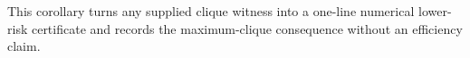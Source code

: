 This corollary turns any supplied clique witness into a one-line numerical lower-risk certificate and records the maximum-clique consequence without an efficiency claim.